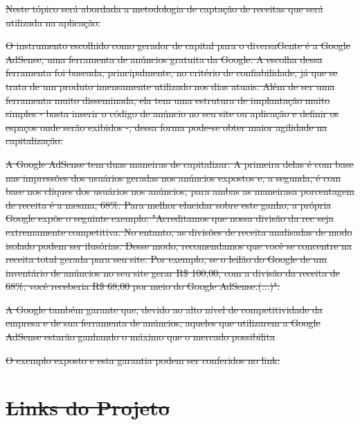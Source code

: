 \documentclass[
    12pt,               %
    openright,          %
    oneside,
    a4paper,            %
    paginasA3,  %
    BIBLATEX,           %
    REFINDENT,          %
    MODELO,             %
    TODO,               %
    english,            %
    brazil              %
    ]{ifsp-spo-inf-ctds} %
\providecommand{\DIFdel}[1]{{\protect\color{red}\sout{#1}}}                      %
\begin{document}
\begin{apendicesenv}
\DIFdel{Neste tópico será abordada a metodologia de captação de receitas que será utilizada na aplicação.
}%

\DIFdel{O instrumento escolhido como gerador de capital para o diversaGente é a Google AdSense, uma ferramenta de anúncios gratuita da Google. A escolha dessa ferramenta foi baseada, principalmente, no critério de confiabilidade, já que se trata de um produto imensamente utilizado nos dias atuais. Além de ser uma ferramenta muito disseminada, ela tem uma estrutura de implantação muito simples - basta inserir o código de anúncio no seu site ou aplicação e definir os espaços onde serão exibidos -, dessa forma pode-se obter maior agilidade na capitalização.
}%

\DIFdel{A Google AdSense tem duas maneiras de capitalizar. A primeira delas é com base nas impressões dos usuários geradas nos anúncios expostos e, a segunda, é com base nos cliques dos usuários nos anúncios; para ambas as maneirasa porcentagem de receita é a mesma, 68\%. Para melhor elucidar sobre este ganho, a própria Google expõe o seguinte exemplo: "Acreditamos que nossa divisão da rec seja extremamente competitiva. No entanto, as divisões de receita analisadas de modo isolado podem ser ilusórias. Desse modo, recomendamos que você se concentre na receita total gerada para seu site. Por exemplo, se o leilão do Google de um inventário de anúncios no seu site gerar R\$ 100,00, com a divisão da receita de 68\%, você receberia R\$ 68,00 por meio do Google AdSense.(...)". 
}%

\DIFdel{A Google também garante que, devido ao alto nível de competitividade da empresa e de sua ferramenta de anúncios, aqueles que utilizarem a Google AdSense estarão ganhando o máximo que o mercado possibilita
}%

\DIFdel{O exemplo exposto e esta garantia podem ser conferidos no link:}%

\chapter{\DIFdel{Links do Projeto}}
\addtocounter{chapter}{-1}%

\end{apendicesenv}
\end{document}
